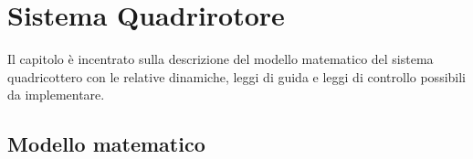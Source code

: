 \chapter{Sistema Quadrirotore}
Il capitolo è incentrato sulla descrizione del modello matematico del sistema quadricottero con le relative dinamiche, leggi di guida e leggi di controllo possibili da implementare.
\section{Modello matematico}
